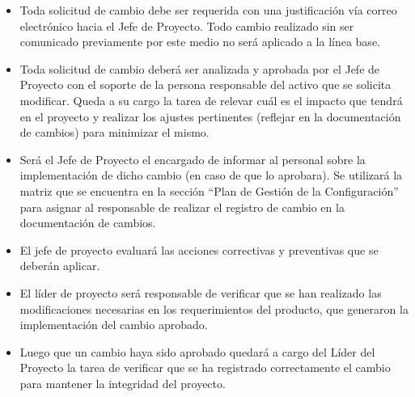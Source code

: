 \begin{itemize}
	\item Toda solicitud de cambio debe ser requerida con una justificación vía correo electrónico hacia el Jefe de Proyecto. Todo cambio realizado sin ser comunicado previamente por este medio no será aplicado a la línea base.
	\item Toda solicitud de cambio deberá ser analizada y aprobada por el Jefe de Proyecto con el soporte de la persona responsable del activo que se solicita modificar. Queda a su cargo la tarea de relevar cuál es el impacto que tendrá en el proyecto y realizar los ajustes pertinentes (reflejar en la documentación de cambios) para minimizar el mismo.
	\item Será el Jefe de Proyecto el encargado de informar al personal sobre la implementación de dicho cambio (en caso de que lo aprobara). Se utilizará la matriz que se encuentra en la sección “Plan de Gestión de la Configuración” para asignar al responsable de realizar el registro de cambio en la documentación de cambios.
	\item El jefe de proyecto evaluará las acciones correctivas y preventivas que se deberán aplicar.
	\item El líder de proyecto será responsable de verificar que se han realizado las modificaciones necesarias en los requerimientos del producto, que generaron la implementación del cambio aprobado.
	\item Luego que un cambio haya sido aprobado quedará a cargo del Líder del Proyecto la tarea de verificar que se ha registrado correctamente el cambio para mantener la integridad del proyecto.
\end{itemize}
